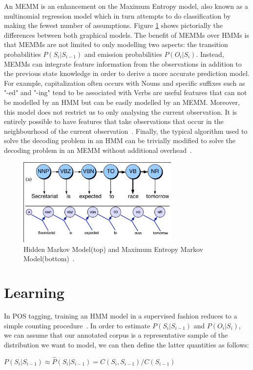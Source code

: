 \documentclass{acm_proc_article-sp}
\begin{document}
An MEMM is an enhancement on the Maximum Entropy model, also known as a multinomial regression model which in turn attempts to do classification by making the fewest number of assumptions. Figure \ref{hmmVmemm} shows pictorially the differences between both graphical models. The benefit of MEMMs over HMMs is that MEMMs are not limited to only modelling two aspects: the transition probabilities $P( S_i | S_{i-1} )$ and emission probabilities $P( O_i | S_i )$. Instead, MEMMs can integrate feature information from the observations in addition to the previous state knowledge in order to derive a more accurate prediction model. For example, capitalization often occurs with Nouns and specific suffixes such as "-ed" and "-ing" tend to be associated with Verbs are useful features that can not be modelled by an HMM but can be easily modelled by an MEMM. Moreover, this model does not restrict us to only analysing the current observation. It is entirely possible to have features that take observations that occur in the neighbourhood of the current observation~\cite{nlpBook}. Finally, the typical algorithm used to solve the decoding problem in an HMM can be trivially modified to solve the decoding problem in an MEMM without additional overhead~\cite{memmPaper}.
\begin{figure}[ht]
\centering
\includegraphics[width=80mm]{figures/memm.png}
\caption{Hidden Markov Model(top) and Maximum Entropy Markov Model(bottom)~\cite{nlpBook}. \label{hmmVmemm}}
\end{figure}

\section{Learning}
In POS tagging, training an HMM model in a supervised fashion reduces to a simple counting procedure~\cite{nlpBook}. In order to estimate $P( S_i | S_{i-1} )$ and $P( O_i | S_i )$, we can assume that our annotated corpus is a representative sample of the distribution we want to model, we can then define the latter quantities as follows:

$P( S_i | S_{i-1} ) \approx \hat{P}( S_i | S_{i-1} ) = C( S_i, S_{i-1} )/C( S_{i-1} )$
\end{document}
